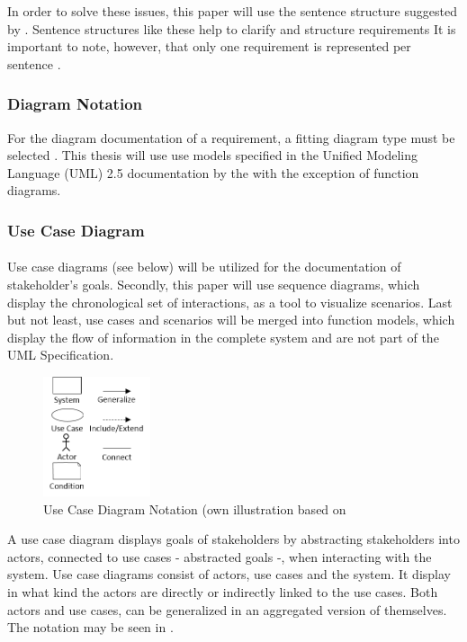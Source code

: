In order to solve these issues, this paper will use the sentence structure suggested by \textcites[107]{Ebert.2014}[246]{Pohl.2007}. Sentence structures like these help to clarify and structure requirements It is important to note, however, that only one requirement is represented per sentence \parencite[107]{Ebert.2014}. 


\subsubsection{Diagram Notation}
For the diagram documentation of a requirement, a fitting diagram type must be selected \parencite[299]{Pohl.2007}. This thesis will use use models specified in the Unified Modeling Language (UML) 2.5 documentation by the \textcite{ObjectManagementGroup.01.03.2015} with the exception of function diagrams. 


\subsubsection{Use Case Diagram}

\paragraph{\label{par:useCaes}}
Use case diagrams (see below) will be utilized for the documentation of stakeholder's goals. Secondly, this paper will use sequence diagrams, which display the chronological set of interactions, as a tool to visualize scenarios. Last but not least, use cases and scenarios will be merged into function models, which display the flow of information in the complete system and are not part of the UML Specification. 

\begin{figure}[H] 
    \centering
    \includegraphics[width=0.28\textwidth]{img/ucSymb.png}
    \caption{Use Case Diagram Notation (own illustration based on \cite[163]{Pohl.2007}}\label{fig:ucSymb}
\end{figure}

A use case diagram displays goals of stakeholders by abstracting stakeholders into actors, connected to use cases - abstracted goals -, when interacting with the system. Use case diagrams consist of actors, use cases and the system. It display in what kind the actors are directly or indirectly linked to the use cases. Both actors and use cases, can be generalized in an aggregated version of themselves. The notation may be seen in .

